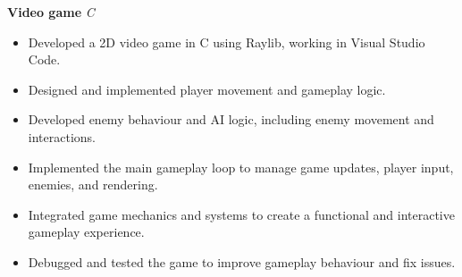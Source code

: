 \textbf{Video game} \hfill \textit{C}

\begin{itemize}
    \item Developed a 2D video game in C using Raylib, working in Visual Studio Code.
    \item Designed and implemented player movement and gameplay logic.
    \item Developed enemy behaviour and AI logic, including enemy movement and interactions.
    \item Implemented the main gameplay loop to manage game updates, player input, enemies, and rendering.
    \item Integrated game mechanics and systems to create a functional and interactive gameplay experience.
    \item Debugged and tested the game to improve gameplay behaviour and fix issues.
\end{itemize}